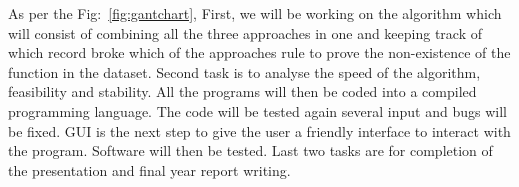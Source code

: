 As per the Fig:~\ref{fig:gantchart}, First, we will be working on the algorithm which will consist of combining all the three approaches in one and keeping track of which record broke which of the approaches rule to prove the non-existence of the function in the dataset. Second task is to analyse the speed of the algorithm, feasibility and stability. All the programs will then be coded into a compiled programming language. The code will be tested again several input and bugs will be fixed. GUI is the next step to give the user a friendly interface to interact with the program. Software will then be tested. Last two tasks are for completion of the presentation and final year report writing.